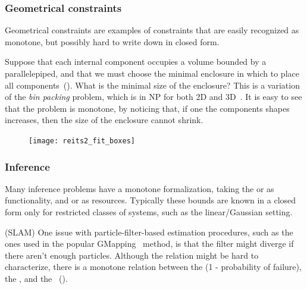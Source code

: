 \subsubsection{Geometrical constraints}

Geometrical constraints are examples of constraints that are easily
recognized as monotone, but possibly hard to write down in closed
form.

\begin{example}
Suppose that each internal component occupies a volume
bounded by a parallelepiped, and that we must choose the minimal enclosure
in which to place all components~(). What
is the minimal size of the enclosure? This is a variation of the \emph{bin
packing} problem, which is in NP for both 2D and 3D~\cite{lodi02two}.
It is easy to see that the problem is monotone, by noticing that,
if one the components shapes increases, then the size of the enclosure
cannot shrink.
\end{example}

\begin{figure}[h]
    \centering
\texttt{[image: reits2\_fit\_boxes]}
\caption{\label{fig:packing}}
\end{figure}



\subsubsection{Inference}

Many inference problems have a monotone formalization, taking the
 or  as functionality, and 
or  as resources. Typically these bounds are known in
a closed form only for restricted classes of systems, such as the
linear/Gaussian setting.

\begin{example}
(SLAM) One issue with particle-filter-based estimation procedures,
such as the ones used in the popular GMapping~\cite{grisetti07improved}
method, is that the filter might diverge if there aren't enough particles.
Although the relation might be hard to characterize, there is a monotone
relation between the  (1 - probability of failure),
the , and the ~().
\end{example}

\begin{figure}[h]
    \centering
\caption{\label{fig:gmapping} }
\end{figure}



